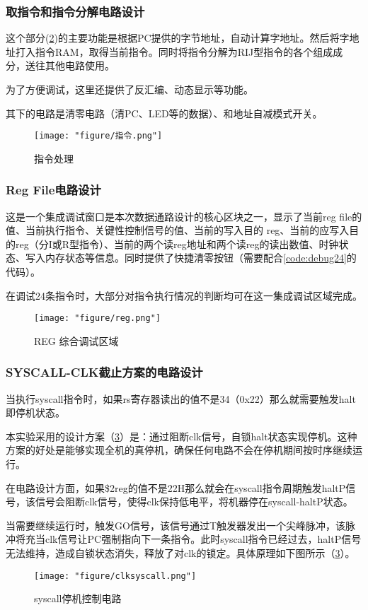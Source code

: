 \documentclass[withoutpreface]{cumcmthesis}
\begin{document}
\subsubsection{取指令和指令分解电路设计}
这个部分(\cref{fig:c1})的主要功能是根据PC提供的字节地址，自动计算字地址。然后将字地址打入指令RAM，取得当前指令。同时将指令分解为RIJ型指令的各个组成成分，送往其他电路使用。

为了方便调试，这里还提供了反汇编、动态显示等功能。

其下的电路是清零电路（清PC、LED等的数据）、和地址自减模式开关。
\begin{figure}[!h]
	\centering
	\texttt{[image: "figure/指令.png"]}
	\caption{指令处理}
	\label{fig:c1}
\end{figure}
\subsubsection{Reg File电路设计}
这是一个集成调试窗口是本次数据通路设计的核心区块之一，显示了当前reg file的值、当前执行指令、关键性控制信号的值、当前的写入目的 reg、当前的应写入目的reg（分I或R型指令）、当前的两个读reg地址和两个读reg的读出数值、时钟状态、写入内存状态等信息。同时提供了快捷清零按钮（需要配合\cref{code:debug24}的代码）。

在调试24条指令时，大部分对指令执行情况的判断均可在这一集成调试区域完成。
\begin{figure}[!h]
	\centering
	\texttt{[image: "figure/reg.png"]}
	\caption{REG 综合调试区域}
	\label{fig:c1}
\end{figure}
\subsubsection{SYSCALL-CLK截止方案的电路设计}
当执行syscall指令时，如果rs寄存器读出的值不是34（0x22）那么就需要触发halt即停机状态。

本实验采用的设计方案（\cref{fig:syscall}）是：通过阻断clk信号，自锁halt状态实现停机。这种方案的好处是能够实现全机的真停机，确保任何电路不会在停机期间按时序继续运行。

在电路设计方面，如果\$2reg的值不是22H那么就会在syscall指令周期触发haltP信号，该信号会阻断clk信号，使得clk保持低电平，将机器停在syscall-haltP状态。

当需要继续运行时，触发GO信号，该信号通过T触发器发出一个尖峰脉冲，该脉冲将充当clk信号让PC强制指向下一条指令。此时syscall指令已经过去，haltP信号无法维持，造成自锁状态消失，释放了对clk的锁定。具体原理如下图所示（\cref{fig:syscall}）。
\begin{figure}[!h]
	\centering
	\texttt{[image: "figure/clksyscall.png"]}
	\caption{syscall停机控制电路}
	\label{fig:syscall}
\end{figure}
\end{document}

